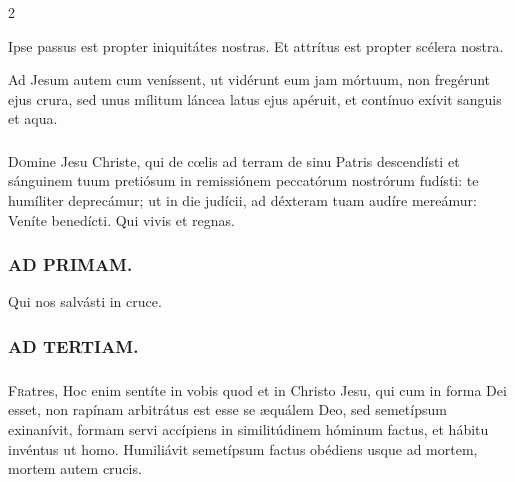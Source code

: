 \documentclass[9pt,twoside]{extarticle}
\begin{document}
\begin{multicols}{2}
\begin{tightlist}{}
\item {} Ipse passus est propter iniquitátes nostras.  Et attrítus est propter scélera nostra.
\item {} Ad Jesum autem cum veníssent, ut vidérunt eum jam mórtuum, non fregérunt ejus crura, sed unus mílitum láncea latus ejus apéruit, et contínuo exívit sanguis et aqua.
\end{tightlist}

\subsubsection*{\center{}}
\lettrine{D}omine Jesu Christe, qui de cœlis ad terram de sinu Patris descendísti et sánguinem tuum pretiósum in remissiónem peccatórum nostrórum fudísti: te humíliter deprecámur; ut in die judícii, ad déxteram tuam audíre mereámur: Veníte benedícti. Qui vivis et regnas.

\begin{tightlist}{}
\item {}
\end{tightlist}

\subsubsection*{\center \textsc{AD PRIMAM.}}
\begin{tightlist}{}
\item {} Qui nos salvásti in cruce.
\end{tightlist}

\subsubsection*{\center \textsc{AD TERTIAM.}}
\subsubsection*{}
\lettrine{F}ratres, Hoc enim sentíte in vobis quod et in Christo Jesu, qui cum in forma Dei esset, non rapínam arbitrátus est esse se æquálem Deo, sed semetípsum exinanívit, formam servi accípiens in similitúdinem hóminum factus, et hábitu invéntus ut homo. Humiliávit semetípsum factus obédiens usque ad mortem, mortem autem crucis.


\end{multicols}
\end{document}
